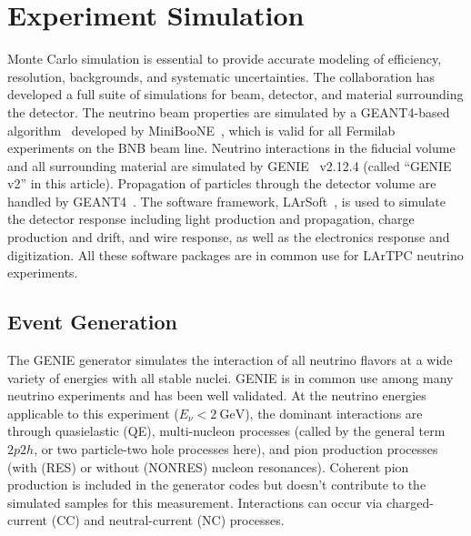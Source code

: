 \documentclass[%
twocolumn,
 amsmath,amssymb,
 aps,
prd,
superscriptaddress,showpacs]{revtex4-2}
\begin{document}
\section{Experiment Simulation} 
\label{sec:expt_sim}
Monte Carlo simulation is essential to provide accurate modeling of efficiency, resolution, backgrounds, and systematic uncertainties.  The \mub collaboration has developed a full suite of simulations for beam, detector, and material surrounding the detector.  The neutrino beam properties are simulated by a GEANT4-based algorithm~\cite{Allison:2016lfl} developed by MiniBooNE~\cite{AAAA_2009_MBflux}, which is valid for all Fermilab experiments on the BNB beam line.  
Neutrino interactions in the fiducial volume and all surrounding material are simulated by GENIE~\cite{Andreopoulos:2009rq} v2.12.4 (called ``GENIE v2'' in this article).  Propagation of particles through the detector volume are handled by GEANT4~\cite{Wright:2015xia}.
The software framework, LArSoft~\cite{Snider:2017wjd}, is used to simulate the detector response including light production and propagation, charge production and drift, and wire response, as well as the electronics response and digitization.
All these software packages are in common use for LArTPC neutrino experiments.

\subsection{Event Generation} 
\label{sec:evgen}
The GENIE generator simulates the interaction of all neutrino flavors at a wide variety of energies with all stable nuclei.  
GENIE is in common use among many neutrino experiments and has been well validated.
At the neutrino energies applicable to this experiment ($E_{\nu} <2\ \mathrm{GeV}$), the dominant interactions are through quasielastic (QE),  multi-nucleon processes (called by the general term $2p2h$, or two particle-two hole processes here), and pion production processes (with (RES) or without (NONRES) nucleon resonances).  Coherent pion production is included in the generator codes but doesn't contribute to the simulated samples for this measurement.
Interactions can occur via charged-current (CC) and neutral-current (NC) processes.
\end{document}
